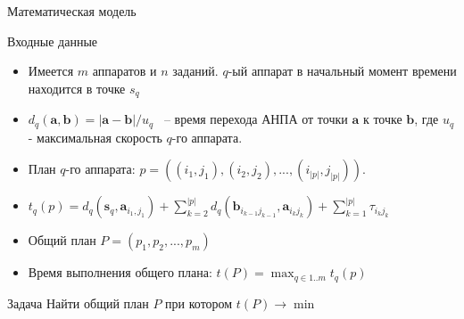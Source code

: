 \documentclass{beamer}
\begin{document}
\begin{frame}{Математическая модель}


\begin{block}{Входные данные}
\begin{itemize}
\item Имеется $m$ аппаратов и $n$ заданий. $q$-ый аппарат в начальный момент времени находится в точке $s_q$
\item $d_q(\mathbf{a}, \mathbf{b}) = |\mathbf{a} - \mathbf{b}| / u_q$ ~-- время перехода АНПА от точки $\mathbf{a}$ к точке $\mathbf{b}$, где $u_q$ - максимальная скорость $q$-го аппарата.
\end{itemize}
\end{block}

\begin{itemize}

\item План $q$-го аппарата: $p = ((i_1, j_1), (i_2, j_2), ..., (i_{|p|}, j_{|p|}))$.

\item
$
t_q(p) = d_q(\mathbf{s}_q, \mathbf{a}_{i_1, j_1}) + \displaystyle\sum_{k=2}^{|p|} d_q(\mathbf{b}_{i_{k-1} j_{k - 1}}, \mathbf{a}_{i_k j_k}) + \displaystyle\sum_{k=1}^{|p|}\tau_{i_k j_k}
$

\item Общий план $P = (p_1, p_2, ..., p_m)$
\item Время выполнения общего плана: $t(P) = \displaystyle \max_{q \in 1..m} t_q(p)$

\end{itemize}

\begin{block}{Задача}
Найти общий план $P$ при котором $t(P) \rightarrow \min$
\end{block}

\end{frame}
\end{document}
